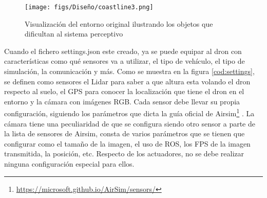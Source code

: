 \begin{figure} [H]
  \begin{center}
    \texttt{[image: figs/Diseño/coastline3.png]}
  \end{center}
  \caption{Visualización del entorno original ilustrando los objetos que dificultan al sistema perceptivo}
  \label{fig:CoastlineModificado}
  \vspace{-1.5em}
\end{figure}
Cuando el fichero settings.json este creado, ya se puede equipar al dron con características como qué sensores va a utilizar, 
el tipo de vehículo, el tipo de simulación, la comunicación y más. Como se muestra en la figura \ref{cod:settings}, se definen como sensores el Lidar para saber a que altura
esta volando el dron respecto al suelo, el GPS para conocer la localización que tiene el dron en el entorno y la cámara con imágenes
RGB. Cada sensor debe llevar su propia configuración, siguiendo los parámetros que dicta la guía oficial de Airsim\footnote{\url{https://microsoft.github.io/AirSim/sensors/}}
. La cámara tiene una peculiaridad de que se configura siendo otro sensor a parte de la lista de sensores de Airsim, consta de varios parámetros que se tienen que configurar como 
el tamaño de la imagen, el uso de ROS, los FPS de la imagen transmitida, la posición, etc. 
Respecto de los actuadores, no se debe realizar ninguna configuración especial para ellos.

